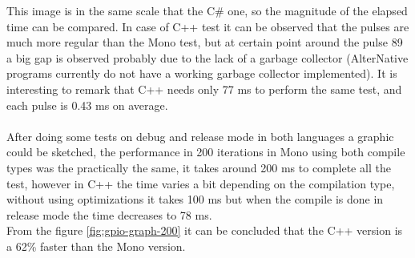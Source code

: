 This image is in the same scale that the C\# one, so the magnitude of the elapsed time can be compared.
In case of C++ test it can be observed that the pulses are much more regular than the Mono test, but at certain point around the pulse 89 a big gap is observed probably due to the lack of a garbage collector (AlterNative programs currently do not have a working garbage collector implemented). It is interesting to remark that C++ needs only 77 ms to perform the same test, and each pulse is 0.43 ms on average.
\\
\\
After doing some tests on debug and release mode in both languages a graphic could be sketched, the performance in 200 iterations in Mono using both compile types was the practically the same, it takes around 200 ms to complete all the test, however in C++ the time varies a bit depending on the compilation type, without using optimizations it takes 100 ms but when the compile is done in release mode the time decreases to 78 ms.
\\
From the figure \ref{fig:gpio-graph-200} it can be concluded that the C++ version is a 62\% faster than the Mono version.
